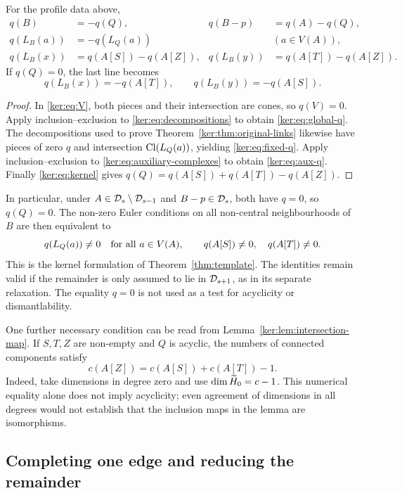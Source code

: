 \begin{proposition}\label{ker:prop:euler}
For the profile data above,
\begin{align}
 q(B)&=-q(Q),&
 q(B-p)&=q(A)-q(Q),\label{ker:eq:global-q}\\
 q(L_B(a))&=-q(L_Q(a)) &&(a\in V(A)),\label{ker:eq:fixed-q}\\
 q(L_B(x))&=q(A[S])-q(A[Z]),&
 q(L_B(y))&=q(A[T])-q(A[Z]).\label{ker:eq:aux-q}
\end{align}
If \(q(Q)=0\), the last line becomes
\[
 q(L_B(x))=-q(A[T]),\qquad
 q(L_B(y))=-q(A[S]).
\]
\end{proposition}
\begin{proof}
In \eqref{ker:eq:V}, both pieces and their intersection are cones,
so \(q(V)=0\). Apply inclusion--exclusion to
\eqref{ker:eq:decompositions} to obtain \eqref{ker:eq:global-q}.
The decompositions used to prove
Theorem~\ref{ker:thm:original-links} likewise have pieces of
zero \(q\) and intersection \(\operatorname{Cl}(L_Q(a))\), yielding
\eqref{ker:eq:fixed-q}.
Apply inclusion--exclusion to \eqref{ker:eq:auxiliary-complexes}
to obtain \eqref{ker:eq:aux-q}.
Finally \eqref{ker:eq:kernel} gives
\(q(Q)=q(A[S])+q(A[T])-q(A[Z])\).
\end{proof}

In particular, under \(A\in\mathcal D_s\setminus\mathcal D_{s-1}\) and
\(B-p\in\mathcal D_s\), both have \(q=0\), so \(q(Q)=0\).
The non-zero Euler conditions on all non-central neighbourhoods
of \(B\) are then equivalent to
\[
 q(L_Q(a))\ne0\quad\hbox{for all }a\in V(A),\qquad
 q(A[S])\ne0,\quad q(A[T])\ne0.
\]
This is the kernel formulation of Theorem~\ref{thm:template}. The identities remain valid if the remainder
is only assumed to lie in \(\mathcal D_{s+1}\), as in its separate
relaxation. The equality \(q=0\) is not used as a
test for acyclicity or dismantlability.

One further necessary condition can be read from
Lemma~\ref{ker:lem:intersection-map}. If \(S,T,Z\) are non-empty
and \(Q\) is acyclic, the numbers of connected components satisfy
\[
 c(A[Z])=c(A[S])+c(A[T])-1.
\]
Indeed, take dimensions in degree zero and use
\(\dim\widetilde H_0=c-1\).
This numerical equality alone does not imply acyclicity; even
agreement of dimensions in all degrees would not establish that
the inclusion maps in the lemma are isomorphisms.

\subsection{Completing one edge and reducing the remainder}


